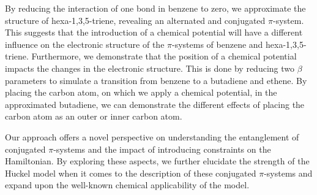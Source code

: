 \documentclass[twoside,twocolumn,9pt]{article}
\begin{document}
By reducing the interaction of one bond in benzene to zero, we approximate the structure of hexa-1,3,5-triene, revealing an alternated and conjugated $\pi$-system. This suggests that the introduction of a chemical potential will have a different influence on the electronic structure of the $\pi$-systems of benzene and hexa-1,3,5-triene. Furthermore, we demonstrate that the position of a chemical potential impacts the changes in the electronic structure. This is done by reducing two $\beta$ parameters to simulate a transition from benzene to a butadiene and ethene. By placing the carbon atom, on which we apply a chemical potential, in the approximated butadiene, we can demonstrate the different effects of placing the carbon atom as an outer or inner carbon atom.

 
Our approach offers a novel perspective on understanding the entanglement of conjugated $\pi$-systems and the impact of introducing constraints on the Hamiltonian. By exploring these aspects, we further elucidate the strength of the H$\ddot{\text{u}}$ckel model when it comes to the description of these conjugated $\pi$-systems and expand upon the well-known chemical applicability of the model.


  
  
\end{document}
